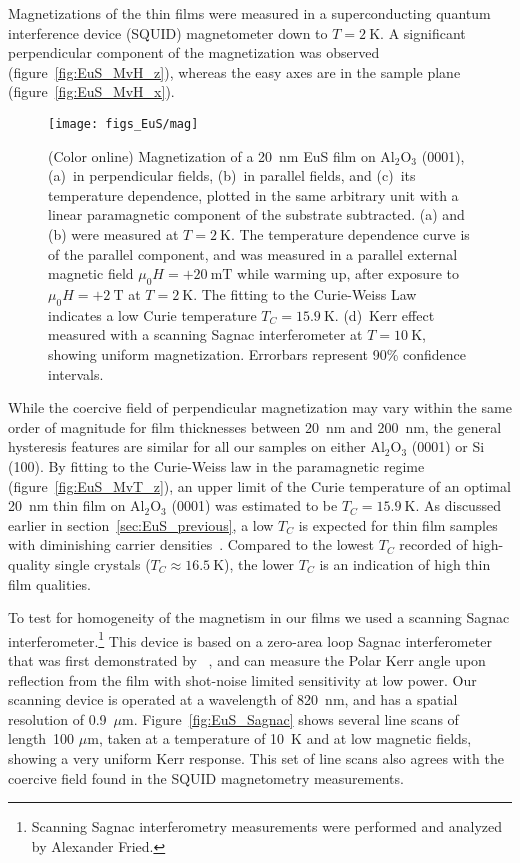Magnetizations of the thin films were measured in a superconducting quantum interference device (SQUID) magnetometer down to $T=2~\mathrm{K}$. A significant perpendicular component of the magnetization was observed (figure~\ref{fig:EuS_MvH_z}), whereas the easy axes are in the sample plane (figure~\ref{fig:EuS_MvH_x}).%
%
\begin{figure}[ht]%
    \subfloat{\label{fig:EuS_MvH_z}}%
    \subfloat{\label{fig:EuS_MvH_x}}%
    \subfloat{\label{fig:EuS_MvT_z}}%
    \subfloat{\label{fig:EuS_Sagnac}}%
    \centering%
    \texttt{[image: figs\_EuS/mag]}%
    \caption[Magnetic properties of EuS thin films]{\label{fig:EuS_magnetic}(Color online) Magnetization of a 20~nm EuS film on Al$_2$O$_3$ (0001), (a)~in perpendicular fields, (b)~in parallel fields, and (c)~its temperature dependence, plotted in the same arbitrary unit with a linear paramagnetic component of the substrate subtracted. (a) and (b) were measured at $T=2~\mathrm{K}$. The temperature dependence curve is of the parallel component, and was measured in a parallel external magnetic field $\mu_0H = +20~\mathrm{mT}$ while warming up, after exposure to $\mu_0H=+2~\mathrm{T}$ at $T=2~\mathrm{K}$. The fitting to the Curie-Weiss Law indicates a low Curie temperature $T_C=15.9~\mathrm{K}$. (d)~Kerr effect measured with a scanning Sagnac interferometer at $T=10~\mathrm{K}$, showing uniform magnetization. Errorbars represent 90\% confidence intervals.}%
\end{figure} %
%
While the coercive field of perpendicular magnetization may vary within the same order of magnitude for film thicknesses between 20~nm and 200~nm, the general hysteresis features are similar for all our samples on either Al$_2$O$_3$ (0001) or Si (100). By fitting to the Curie-Weiss law in the paramagnetic regime (figure~\ref{fig:EuS_MvT_z}), an upper limit of the Curie temperature of an optimal 20~nm thin film on Al$_2$O$_3$ (0001) was estimated to be $T_C=15.9~\mathrm{K}$. As discussed earlier in section~\ref{sec:EuS_previous}, a low $T_C$ is expected for thin film samples with diminishing carrier densities~\cite{EuS_TC_doping, EuS_ntype, EuX_doped_transport, thickness_Tc_theory, thickness_Tc_exp}. Compared to the lowest $T_C$ recorded of high-quality single crystals ($T_C\approx16.5~\mathrm{K}$), the lower $T_C$ is an indication of high thin film qualities.

To test for homogeneity of the magnetism in our films we used a scanning Sagnac interferometer.\footnote{Scanning Sagnac interferometry measurements were performed and analyzed by Alexander Fried.} This device is based on a zero-area loop Sagnac interferometer that was first demonstrated by \citeauthor{Xia2006}~\cite{Xia2006}, and can measure the Polar Kerr angle upon reflection from the film with shot-noise limited sensitivity at low power. Our scanning device is operated at a wavelength of 820~nm, and has a spatial resolution of 0.9~$\mu$m. Figure~\ref{fig:EuS_Sagnac} shows several line scans of length~100 $\mu$m, taken at a temperature of 10~K and at low magnetic fields, showing a very uniform Kerr response. This set of line scans also agrees with the coercive field found in the SQUID magnetometry measurements.

